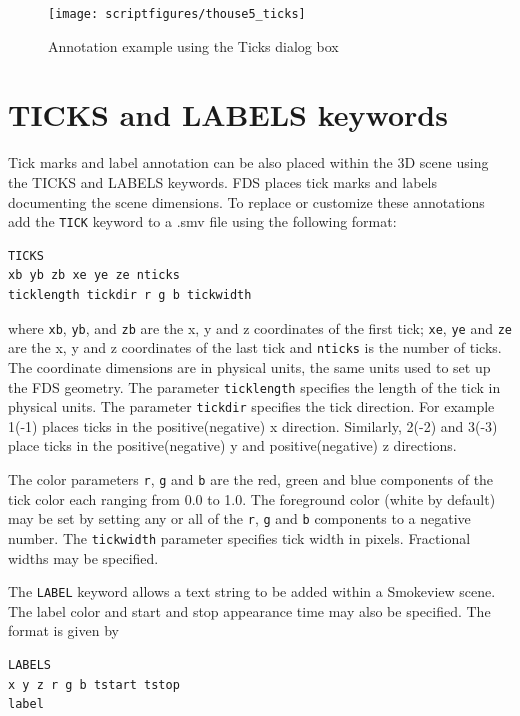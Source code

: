 \documentclass[11pt,twoside]{book}
\newcommand{\figoptions}{hbp}
\begin{document}
\begin{figure}[\figoptions]
\begin{center}
\texttt{[image: scriptfigures/thouse5\_ticks]}
\end{center}
\caption{Annotation example using the Ticks dialog box}
\label{figTICKSdialogexample}%
\end{figure}


\section{TICKS and LABELS keywords}
Tick marks and label annotation
can be also placed within the 3D scene using the TICKS and LABELS keywords.
FDS places tick marks and labels
documenting the scene dimensions.  To replace or customize
these annotations add the {\tt TICK} keyword to a .smv file
using the following format:

\begin{verbatim}
TICKS
xb yb zb xe ye ze nticks
ticklength tickdir r g b tickwidth
\end{verbatim}

\noindent where {\tt xb}, {\tt yb}, and {\tt zb} are the x, y and
z coordinates of the first tick; {\tt xe}, {\tt ye} and {\tt ze}
are the x, y and z coordinates of the last tick and {\tt nticks}
is the number of ticks. The coordinate dimensions are in physical
units, the same units used to set up the FDS geometry. The
parameter {\tt ticklength} specifies the length of the tick in
physical units. The parameter {\tt tickdir} specifies the tick
direction.  For example 1(-1) places ticks in the
positive(negative) x direction. Similarly, 2(-2) and 3(-3) place
ticks in the positive(negative) y and positive(negative) z
directions.

The color parameters {\tt r}, {\tt g} and {\tt b} are the
red, green and blue components of the tick color each
ranging from 0.0 to 1.0. The foreground color (white by
default) may be set by setting any or all of the {\tt r},
{\tt g} and {\tt b} components to a negative number. The
{\tt tickwidth} parameter specifies tick width in pixels.
Fractional widths may be specified.

The {\tt LABEL} keyword allows a text string to be added
within a Smokeview scene.  The label color and start and
stop appearance time may also be specified. The format is
given by

\begin{verbatim}
LABELS
x y z r g b tstart tstop
label
\end{verbatim}
\end{document}
